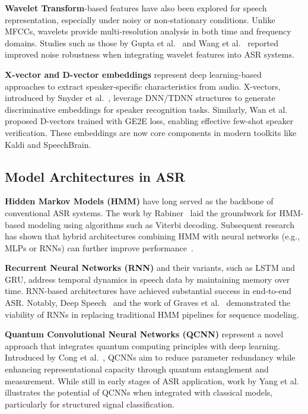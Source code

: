 \documentclass[conference]{IEEEtran}
\begin{document}
\textbf{Wavelet Transform}-based features have also been explored for speech representation, especially under noisy or non-stationary conditions. Unlike MFCCs, wavelets provide multi-resolution analysis in both time and frequency domains. Studies such as those by Gupta et al.~\cite{gupta2003robust} and Wang et al.~\cite{wang2008robust} reported improved noise robustness when integrating wavelet features into ASR systems.

\textbf{X-vector and D-vector embeddings} represent deep learning-based approaches to extract speaker-specific characteristics from audio. X-vectors, introduced by Snyder et al.~\cite{Snyder2018Xvectors}, leverage DNN/TDNN structures to generate discriminative embeddings for speaker recognition tasks. Similarly, Wan et al.~\cite{Wan2018Generalized} proposed D-vectors trained with GE2E loss, enabling effective few-shot speaker verification. These embeddings are now core components in modern toolkits like Kaldi and SpeechBrain.

\subsection{Model Architectures in ASR}

\textbf{Hidden Markov Models (HMM)} have long served as the backbone of conventional ASR systems. The work by Rabiner~\cite{rabiner1989tutorial} laid the groundwork for HMM-based modeling using algorithms such as Viterbi decoding. Subsequent research has shown that hybrid architectures combining HMM with neural networks (e.g., MLPs or RNNs) can further improve performance~\cite{voll2007hybrid, perero2022comparison}.

\textbf{Recurrent Neural Networks (RNN)} and their variants, such as LSTM and GRU, address temporal dynamics in speech data by maintaining memory over time. RNN-based architectures have achieved substantial success in end-to-end ASR. Notably, Deep Speech~\cite{hannun2014deep} and the work of Graves et al.~\cite{graves2013speech} demonstrated the viability of RNNs in replacing traditional HMM pipelines for sequence modeling.

\textbf{Quantum Convolutional Neural Networks (QCNN)} represent a novel approach that integrates quantum computing principles with deep learning. Introduced by Cong et al.~\cite{Cong2019QuantumCNN}, QCNNs aim to reduce parameter redundancy while enhancing representational capacity through quantum entanglement and measurement. While still in early stages of ASR application, work by Yang et al.~\cite{Yang2021Decentralizing} illustrates the potential of QCNNs when integrated with classical models, particularly for structured signal classification.
\end{document}
